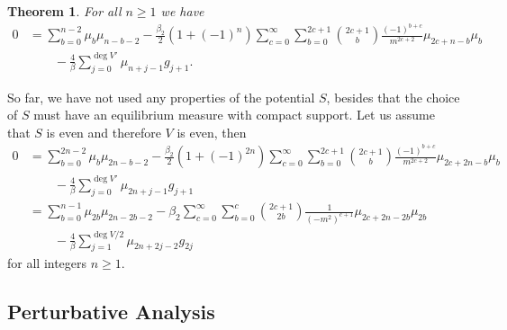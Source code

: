 \documentclass[10pt]{article}
\theoremstyle{plain}
\newtheorem{theorem}{Theorem}
\theoremstyle{definition}
\theoremstyle{plain}
\begin{document}
\begin{theorem}
	For all $n\geq 1$ we have
	\begin{align*}
		0 &= \sum_{b=0}^{n-2} \mu_b\mu_{n-b-2}  - \frac{\beta_2}{2}(1+(-1)^n)\sum_{c=0}^\infty\sum_{b=0}^{2c+1}{2c+1\choose b}\frac{(-1)^{b+c}}{m^{2c+2}} \mu_{2c+n-b}\mu_b  \\&\qquad-\frac{4}{\beta}\sum_{j=0}^{\deg V'}\mu_{n+j-1}g_{j+1}.
	\end{align*}
\end{theorem}

So far, we have not used any properties of the potential $S$, besides that the choice of $S$ must have an equilibrium measure with compact support. Let us assume that $S$ is even and therefore $V$ is even, then
\begin{align}
	0 &= \sum_{b=0}^{2n-2} \mu_b\mu_{2n-b-2}  - \frac{\beta_2}{2}(1+(-1)^{2n})\sum_{c=0}^\infty\sum_{b=0}^{2c+1}{2c+1\choose b}\frac{(-1)^{b+c}}{m^{2c+2}} \mu_{2c+2n-b}\mu_b \nonumber\\&\qquad -\frac{4}{\beta}\sum_{j=0}^{\deg V'}\mu_{2n+j-1}g_{j+1}\nonumber \\
	&= \sum_{b=0}^{n-1} \mu_{2b}\mu_{2n-2b-2}  - \beta_2\sum_{c=0}^\infty\sum_{b=0}^{c}{2c+1\choose 2b}\frac{1}{(-m^2)^{c+1}} \mu_{2c+2n-2b}\mu_{2b} \nonumber\\&\qquad -\frac{4}{\beta}\sum_{j=1}^{\deg V/2}\mu_{2n+2j-2}g_{2j} \label{fermionloopeqs}
\end{align}
for all integers $n\geq 1$. 

\subsection{Perturbative Analysis}
\end{document}
